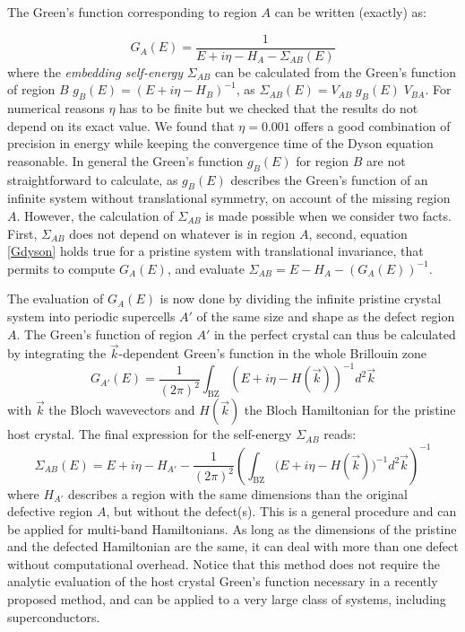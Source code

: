 \documentclass[aps,prb,twocolumn,superscriptaddress]{revtex4-1}
\begin{document}
The Green's function corresponding to region $A$ can be written (exactly) as:

\begin{equation}
  G_{A}(E) %
  = \frac{1}{E +i\eta - H_{A}-\Sigma_{AB}(E)}
  \label{Gdyson}
\end{equation}
where the \emph{embedding self-energy} $\Sigma_{AB}$ can be calculated from the Green's function of region $B$ %
$g_B(E)=(E+i\eta-H_B)^{-1}$, as $\Sigma_{AB}(E)=V_{AB}\;g_B(E)\;V_{BA}$.
For numerical reasons $\eta$ has to be finite but we checked that the results do not depend on its exact value. We found that $\eta=0.001$ offers a good combination of precision in energy while keeping the convergence time of the Dyson equation reasonable.
In general the Green's function $g_B(E)$ for region $B$
are not straightforward to calculate, as $g_B(E)$ describes the Green's function of an infinite system without translational symmetry, on account of the missing region $A$.
However, the calculation of $\Sigma_{AB}$ is made possible when we consider two facts. First, $\Sigma_{AB}$ does not depend on whatever is in region $A$, second, equation \eqref{Gdyson} holds true for a pristine system with translational invariance, that permits to compute $G_A(E)$, and evaluate $\Sigma_{AB}=E- H_A-(G_A(E))^{-1}$.


The evaluation of $G_A(E)$ is now done by dividing the infinite pristine crystal system into periodic supercells $A'$ of the same size and shape as the defect region $A$.
The Green's function of region $A'$ in the perfect crystal can thus be calculated by integrating the $\vec{k}$-dependent Green's function in the whole Brillouin zone
\begin{equation}
  G_{A'}(E) =
\frac{1}{(2\pi)^2}
\int_{\text{BZ}} (E+i\eta-H(\vec{k}))^{-1} d^2\vec{k}
  \label{Gbloch}
\end{equation}
with $\vec{k}$ {the Bloch wavevectors}
and $H(\vec{k})$ the Bloch Hamiltonian for the pristine host
crystal. The final expression for the self-energy $\Sigma_{AB}$ reads:
\begin{equation}
  \Sigma_{AB}(E) = E+i\eta - H_{A'} -
\frac{1}{(2\pi)^2}
\left ({\int_{\text{BZ}}
(E+i\eta-H(\vec{k})})^{-1}d^2\vec{k} \right )^{-1}
\label{selfenergy}
\end{equation}
where $H_{A'}$ describes a region with the same dimensions than the original defective region $A$, but without the defect(s). This is a general procedure and can be applied for multi-band Hamiltonians. As long as the dimensions of the pristine and the defected Hamiltonian are the same, it can deal with more than one defect without computational overhead. Notice that this method does not require the analytic evaluation of the host crystal Green's function necessary in a recently proposed method\cite{settnes2015}, and can be applied to a very large class of systems, including superconductors.\cite{lado2016}
\end{document}

